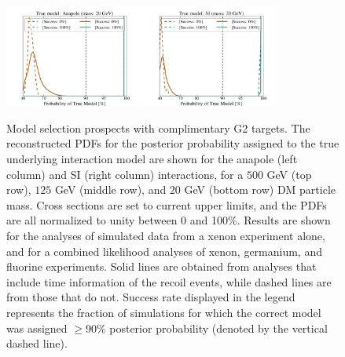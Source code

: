 \documentclass[11pt]{article}
\begin{document}
\begin{figure}
\includegraphics[width=0.4\textwidth, trim=.6cm 0.0cm .6cm 0.0cm,clip=true]{plots/PDF_Single_20GeV_Anapole_50sims_Xe_vs_FGeXe_GF_TNT.pdf}
\includegraphics[width=0.4\textwidth, trim=.6cm 0.0cm .6cm 0.0cm,clip=true]{plots/PDF_Single_20GeV_SI_Higgs_50sims_Xe_vs_FGeXe_GF_TNT.pdf}
\caption{\label{fig:gen2}
Model selection prospects with complimentary G2 targets. The reconstructed PDFs for the posterior probability assigned to the true underlying interaction model are shown for the anapole (left column) and SI (right column) interactions, for a $500$ GeV (top row), $125$ GeV (middle row), and $20$ GeV (bottom row) DM particle mass. Cross sections are set to current upper limits, and the PDFs are all normalized to unity between 0 and 100$\%$. Results are shown for the analyses of simulated data from a xenon experiment alone, and for a combined likelihood analyses of xenon, germanium, and fluorine experiments. Solid lines are obtained from analyses that include time information of the recoil events, while dashed lines are from those that do not. Success rate displayed in the legend represents the fraction of simulations for which the correct model was assigned $ \geq 90\%$ posterior probability (denoted by the vertical dashed line).}
\end{figure}
\end{document}
